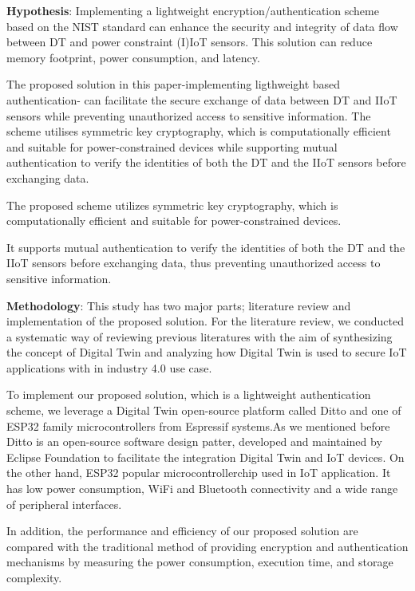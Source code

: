 \textbf{Hypothesis}:
Implementing a lightweight encryption/authentication scheme based on the NIST standard can enhance the security and integrity of data flow between DT and power constraint (I)IoT sensors. This solution can reduce memory footprint, power consumption, and latency. 

The proposed solution in this paper-implementing ligthweight based authentication- can facilitate the secure exchange of data between DT and IIoT sensors while preventing unauthorized access to sensitive information. The scheme utilises symmetric key cryptography, which is computationally efficient and suitable for power-constrained devices while supporting mutual authentication to verify the identities of both the DT and the IIoT sensors before exchanging data.



The proposed scheme utilizes symmetric key cryptography, which is computationally efficient and suitable for power-constrained devices. 

It supports mutual authentication to verify the identities of both the DT and the IIoT sensors before exchanging data, thus preventing unauthorized access to sensitive information.



\textbf{Methodology}:
This study has two major parts; literature review and implementation of the proposed solution. For the literature review, we conducted a systematic way of reviewing previous literatures with the aim of synthesizing the concept of Digital Twin and analyzing how Digital Twin is used to secure IoT applications with in industry 4.0 use case. 

To implement our proposed solution, which is a lightweight authentication scheme, we leverage a 
Digital Twin open-source platform called Ditto and one of ESP32 family microcontrollers from Espressif systems.As we mentioned before Ditto is an open-source software design patter, developed and maintained by Eclipse Foundation to facilitate the integration  Digital Twin and IoT devices\cite{noauthor_eclipse_nodate}. On the other hand, ESP32 popular microcontrollerchip used in IoT application. It has low power consumption, WiFi and Bluetooth connectivity and a wide range of peripheral interfaces.  

In addition, the performance and efficiency of our proposed solution are compared with the traditional  method of providing encryption and authentication mechanisms by measuring the power consumption, execution time, and storage complexity. 

